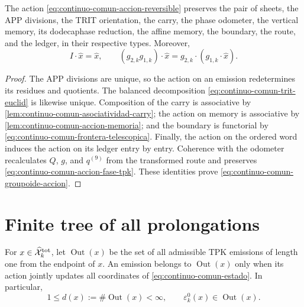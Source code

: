 \begin{lemma}
\label{lem:continuo-comun-groupoide-conserva}
The action \eqref{eq:continuo-comun-accion-reversible} preserves the pair of
sheets, the APP divisions, the TRIT orientation, the carry, the phase
odometer, the vertical memory, its dodecaphase reduction, the affine memory, the
boundary, the route, and the ledger, in their respective types.  Moreover,
\begin{equation}
\label{eq:continuo-comun-groupoide-accion}
 I\cdot\widehat x=\widehat x,
 \qquad
 (g_{2,k}g_{1,k})\cdot\widehat x
 =g_{2,k}\cdot(g_{1,k}\cdot\widehat x).
\end{equation}
\end{lemma}

\begin{proof}
The APP divisions are unique, so the action on an emission
redetermines its residues and quotients.  The balanced decomposition
\eqref{eq:continuo-comun-trit-euclid} is likewise unique.  Composition of the
carry is associative by
\cref{lem:continuo-comun-asociatividad-carry}; the action on memory is associative
by \cref{lem:continuo-comun-accion-memoria}; and the boundary is functorial by
\eqref{eq:continuo-comun-frontera-telescopica}.  Finally, the action on
the ordered word induces the action on its ledger entry by entry.
Coherence with the odometer recalculates \(Q\), \(g\), and \(q^{(9)}\) from
the transformed route and preserves
\eqref{eq:continuo-comun-accion-fase-tpk}. These identities prove
\eqref{eq:continuo-comun-groupoide-accion}.
\end{proof}

\section{Finite tree of all prolongations}
\label{sec:continuo-comun-arbol}

For \(x\in\widehat{\mathcal X}^{\rm tot}_k\), let
\(\operatorname{Out}(x)\) be the set of all admissible TPK emissions
of length one from the endpoint of \(x\).  An emission belongs to
\(\operatorname{Out}(x)\) only when its action jointly updates all
coordinates of \eqref{eq:continuo-comun-estado}.  In particular,
\begin{equation}
\label{eq:continuo-comun-out-finito}
 1\leq d(x):=\#\operatorname{Out}(x)<\infty,
 \qquad
 \varepsilon^0_k(x)\in\operatorname{Out}(x).
\end{equation}

